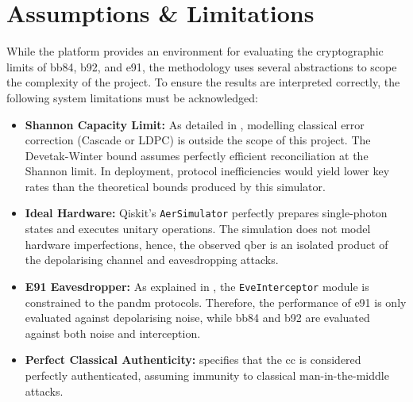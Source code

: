 \newpage
\section{Assumptions \& Limitations}
\label{sec:assumptionslimitations}
While the platform provides an environment for evaluating the cryptographic limits of \gls{bb84}, \gls{b92}, and \gls{e91}, the methodology uses several abstractions to scope the complexity of the project. To ensure the results are interpreted correctly, the following system limitations must be acknowledged:

\begin{itemize}
    \item \textbf{Shannon Capacity Limit:} As detailed in , modelling classical error correction (Cascade or LDPC) is outside the scope of this project. The Devetak-Winter bound assumes perfectly efficient reconciliation at the Shannon limit. In deployment, protocol inefficiencies would yield lower key rates than the theoretical bounds produced by this simulator.
    \item \textbf{Ideal Hardware:} Qiskit's \texttt{AerSimulator} perfectly prepares single-photon states and executes unitary operations. The simulation does not model hardware imperfections, hence, the observed \gls{qber} is an isolated product of the depolarising channel and eavesdropping attacks.
    \item \textbf{E91 Eavesdropper:} As explained in , the \texttt{EveInterceptor} module is constrained to the \gls{pandm} protocols. Therefore, the performance of \gls{e91} is only evaluated against depolarising noise, while \gls{bb84} and \gls{b92} are evaluated against both noise and interception.
    \item \textbf{Perfect Classical Authenticity:}  specifies that the \gls{cc} is considered perfectly authenticated, assuming immunity to classical man-in-the-middle attacks.
\end{itemize}
